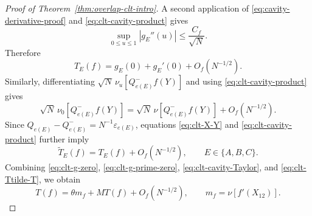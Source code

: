\documentclass[11pt]{article}
\numberwithin{equation}{section}
\newcommand{\1}{\mathbf 1}
\begin{document}
\begin{proof}[Proof of Theorem~\ref{thm:overlap-clt-intro}]
A second application of \eqref{eq:cavity-derivative-proof} and
\eqref{eq:clt-cavity-product} gives
\begin{equation}
 \sup_{0\le u\le1}|g_E''(u)|\le\frac{C_f}{\sqrt N}.
 \label{eq:clt-second-cavity-derivative}
\end{equation}
Therefore
\begin{equation}
 T_E(f)=g_E(0)+g_E'(0)+O_f(N^{-1/2}).
 \label{eq:clt-cavity-Taylor}
\end{equation}
Similarly, differentiating
$\sqrt N\,\nu_u[Q^-_{e(E)}f(Y)]$ and using
\eqref{eq:clt-cavity-product} gives
\begin{equation}
 \sqrt N\,\nu_0[Q^-_{e(E)}f(Y)]
 =
 \sqrt N\,\nu[Q^-_{e(E)}f(Y)]+O_f(N^{-1/2}).
 \label{eq:clt-u-endpoint-replacement}
\end{equation}
Since $Q_{e(E)}-Q^-_{e(E)}=N^{-1}\varepsilon_{e(E)}$, equations
\eqref{eq:clt-X-Y} and \eqref{eq:clt-cavity-product} further imply
\begin{equation}
 \widetilde T_E(f)=T_E(f)+O_f(N^{-1/2}),
 \qquad E\in\{A,B,C\}.
 \label{eq:clt-Ttilde-T}
\end{equation}
Combining \eqref{eq:clt-g-zero}, \eqref{eq:clt-g-prime-zero},
\eqref{eq:clt-cavity-Taylor}, and \eqref{eq:clt-Ttilde-T}, we obtain
\begin{equation}
 T(f)=\theta m_f+MT(f)+O_f(N^{-1/2}),
 \qquad m_f=\nu[f'(X_{12})].
 \label{eq:clt-vector-Stein}
\end{equation}


\end{proof}
\end{document}
